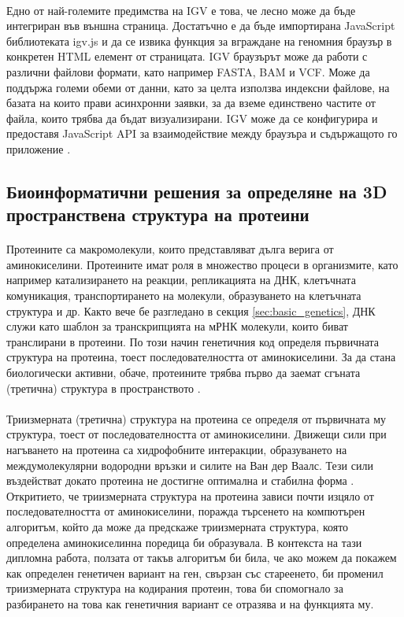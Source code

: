 \documentclass[pdftex,cyrillic,14pt,a4page,twoside,openright]{extreport}
\begin{document}
\paragraph{}
Едно от най-големите предимства на IGV е това, че лесно може да бъде интегриран във външна страница. Достатъчно е да бъде импортирана JavaScript библиотеката igv.js и да се извика функция за вграждане на геномния браузър в конкретен HTML елемент от страницата. IGV браузърът може да работи с различни файлови формати, като например FASTA, BAM и VCF. Може да поддържа големи обеми от данни, като за целта използва индексни файлове, на базата на които прави асинхронни заявки, за да вземе единствено частите от файла, които трябва да бъдат визуализирани. IGV може да се конфигурира и предоставя JavaScript API за взаимодействие между браузъра и съдържащото го приложение \cite{robinson2020}.

\subsection{Биоинформатични решения за определяне на 3D пространствена структура на протеини}
\paragraph{}
Протеините са макромолекули, които представляват дълга верига от аминокиселини. Протеините имат роля в множество процеси в организмите, като например катализирането на реакции, репликацията на ДНК, клетъчната комуникация, транспортирането на молекули, образуването на клетъчната структура и др. Както вече бе разгледано в секция \ref{sec:basic_genetics}, ДНК служи като шаблон за транскрипцията на мРНК молекули, които биват транслирани в протеини. По този начин генетичния код определя първичната структура на протеина, тоест последователността от аминокиселини. За да стана биологически активни, обаче, протеините трябва първо да заемат сгъната (третична) структура в пространството \cite{creighton1990protein}.

\paragraph{}
Триизмерната (третична) структура на протеина се определя от първичната му структура, тоест от последователността от аминокиселини. Движещи сили при нагъването на протеина са хидрофобните интеракции, образуването на междумолекулярни водородни връзки и силите на Ван дер Ваалс. Тези сили въздействат докато протеина не достигне оптимална и стабилна форма \cite{dill2008}. Откритието, че триизмерната структура на протеина зависи почти изцяло от последователността от аминокиселини, поражда търсенето на компютърен алгоритъм, който да може да предскаже триизмерната структура, която определена аминокиселинна поредица би образувала. В контекста на тази дипломна работа, ползата от такъв алгоритъм би била, че ако можем да покажем как определен генетичен вариант на ген, свързан със стареенето, би променил триизмерната структура на кодирания протеин, това би спомогнало за разбирането на това как генетичния вариант се отразява и на функцията му.
\end{document}
